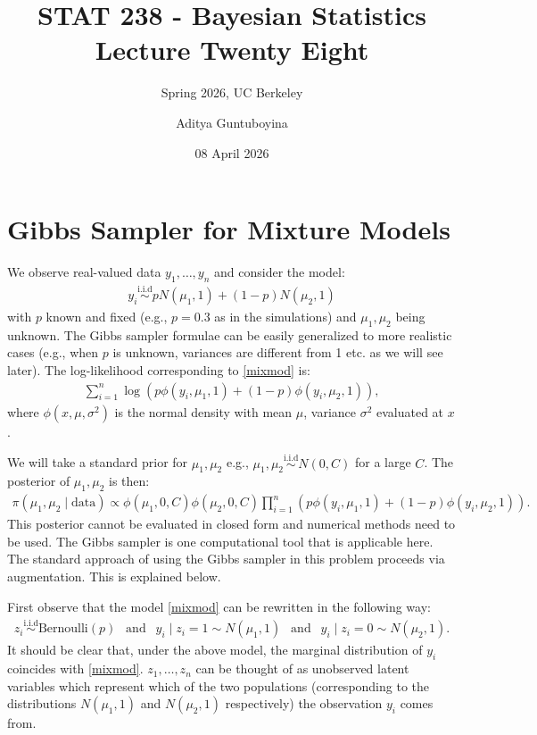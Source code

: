 \documentclass{scrartcl}
\begin{document}
\title{STAT 238 - Bayesian Statistics  \\
  Lecture Twenty Eight} 
\subtitle{Spring 2026, UC Berkeley}

\author{Aditya Guntuboyina}


\date{08 April 2026}

\maketitle

\section{Gibbs Sampler for Mixture Models}

We observe real-valued data $y_1, \dots, y_n$ and consider the model:
\begin{align}\label{mixmod}
  y_i \overset{\text{i.i.d}}{\sim} p N(\mu_1, 1) + (1 - p) N(\mu_2, 1)
\end{align}
with $p$ known and fixed (e.g., $p = 0.3$ as in the simulations) and
$\mu_1, \mu_2$ being unknown. The Gibbs sampler formulae can be easily
generalized to more realistic cases (e.g., when $p$ is unknown,
variances are different from 1 etc. as we will see later). The
log-likelihood corresponding to \eqref{mixmod} is:
\begin{align*}
  \sum_{i=1}^n \log \left(p \phi(y_i, \mu_1, 1) + (1 - p) \phi(y_i,
  \mu_2, 1) \right), 
\end{align*}
where $\phi(x, \mu, \sigma^2)$ is the normal density with mean $\mu$,
variance $\sigma^2$ evaluated at $x$.


We will take a standard prior for $\mu_1, \mu_2$ e.g., $\mu_1, \mu_2
\overset{\text{i.i.d}}{\sim} N(0, C)$ for a large $C$. The posterior
of $\mu_1, \mu_2$ is then:
\begin{align*}
\pi(\mu_1, \mu_2 \mid \text{data}) \propto \phi(\mu_1, 0, C) \phi(\mu_2,
  0, C) \prod_{i=1}^n \left(p \phi(y_i, \mu_1, 1) + (1 - p) \phi(y_i,
  \mu_2, 1) \right). 
\end{align*}
This posterior cannot be evaluated in closed form and numerical
methods need to be used. The Gibbs sampler is one computational tool
that is applicable here. The standard approach of using the Gibbs
sampler in this problem proceeds via augmentation. This is explained
below.

First observe that the model \eqref{mixmod} can be rewritten in the
following way:
\begin{align*}
  z_i \overset{\text{i.i.d}}{\sim} \text{Bernoulli}(p) ~~ \text{ and }
  ~~ y_i \mid z_i = 1 \sim N(\mu_1, 1) ~~ \text{ and } ~~ y_i \mid z_i
  = 0 \sim N(\mu_2, 1). 
\end{align*}
It should be clear that, under the above model, the marginal
distribution of $y_i$ coincides with \eqref{mixmod}. $z_1, \dots, z_n$
can be thought of as unobserved latent variables which represent which
of the two populations (corresponding to the distributions $N(\mu_1,
1)$ and $N(\mu_2, 1)$ respectively) the observation $y_i$ comes from.
\end{document}

